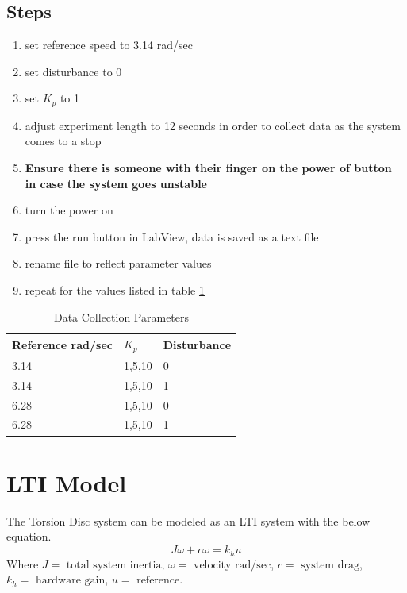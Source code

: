 \documentclass[11pt,titlepage]{article}
\begin{document}
	\subsection*{Steps}
		\begin{enumerate}
			\item set reference speed to 3.14 rad/sec
			\item set disturbance to 0
			\item set $K_p$ to 1
			\item adjust experiment length to 12 seconds in order to collect data as the system comes to a stop
			\item \textbf{Ensure there is someone with their finger on the power of button in case the system goes unstable}
			\item turn the power on
			\item press the run button in LabView, data is saved as a text file
			\item rename file to reflect parameter values
			\item repeat for the values listed in table \ref{table:data_param}
		\end{enumerate}
		\begin{table}[H]
			\centering
			\begin{tabular}{|m{4cm}|m{3cm}|m{3cm}|} 
				\hline
				Reference rad/sec & $K_p$ & Disturbance \\ 
				\hline
				3.14 & 1,5,10 & 0\\
				\hline
				3.14 & 1,5,10 & 1\\
				\hline
				6.28 & 1,5,10 & 0 \\
				\hline
				6.28 & 1,5,10 & 1 \\
				\hline
			\end{tabular}
			\caption{Data Collection Parameters} \label{table:data_param}
		\end{table}

\section{LTI Model} \label{sec:LTI}
	The Torsion Disc system can be modeled as an LTI system with the below equation.
	\begin{equation} \label{eq:lti}
		J\dot{\omega}+c\omega=k_hu
	\end{equation}
	Where $J=\mbox{ total system inertia}$, $\omega=\mbox{ velocity rad/sec}$, $c=\mbox{ system drag}$, $k_h=\mbox{ hardware gain}$, $u=\mbox{ reference}$.
\end{document}
